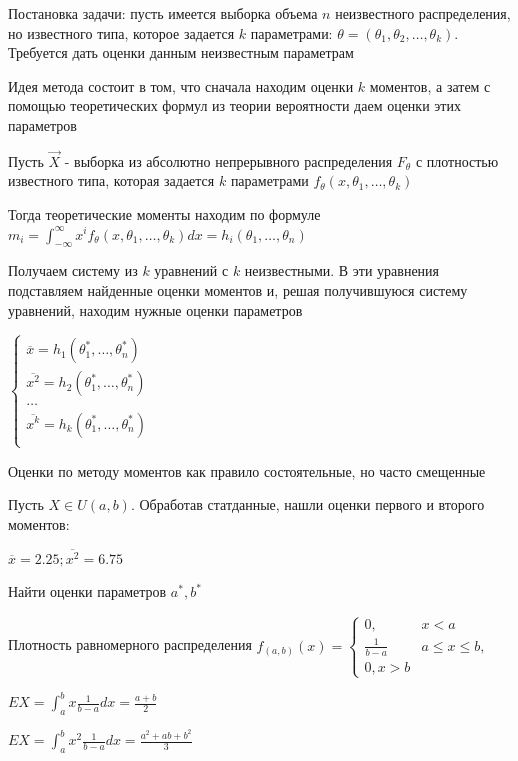 \documentclass[12pt]{article}
\begin{document}
\hypertarget{method_of_moments}{}

Постановка задачи: пусть имеется выборка объема $n$ неизвестного распределения, но известного типа,
которое задается $k$ параметрами: $\theta = (\theta_1, \theta_2, \dots, \theta_k)$. Требуется дать оценки данным
неизвестным параметрам

Идея метода состоит в том, что сначала находим оценки $k$ моментов, а затем с помощью теоретических формул
из теории вероятности даем оценки этих параметров

Пусть $\vec{X}$ - выборка из абсолютно непрерывного распределения $F_\theta$ с плотностью известного типа, 
которая задается $k$ параметрами $f_\theta (x, \theta_1, \dots, \theta_k)$

Тогда теоретические моменты находим по формуле $m_i = \int_{-\infty}^{\infty} x^i f_\theta (x, \theta_1, \dots, \theta_k) dx = h_i(\theta_1, \dots, \theta_n)$

Получаем систему из $k$ уравнений с $k$ неизвестными. В эти уравнения подставляем найденные оценки
моментов и, решая получившуюся систему уравнений, находим нужные оценки параметров

$\begin{cases}
    \overline{x} = h_1(\theta_1^*, \dots, \theta_n^*) \\ 
    \overline{x^2} = h_2(\theta_1^*, \dots, \theta_n^*) \\ 
    \dots \\
    \overline{x^k} = h_k(\theta_1^*, \dots, \theta_n^*) \\ 
\end{cases}$

\Nota Оценки по методу моментов как правило состоятельные, но часто смещенные

\Ex Пусть $X \in U(a, b)$. Обработав статданные, нашли оценки первого и второго моментов:

$\overline{x} = 2.25; \overline{x^2} = 6.75$

Найти оценки параметров $a^*, b^*$

Плотность равномерного распределения $f_{(a, b)} (x) = \begin{cases}0, & x < a \\ \frac{1}{b - a} & a \leq x \leq b, \\ 0, x > b\end{cases}$

$EX = \int_a^b x \frac{1}{b - a} dx = \frac{a + b}{2}$

$EX = \int_a^b x^2 \frac{1}{b - a} dx = \frac{a^2 + ab + b^2}{3}$
\end{document}
